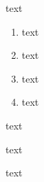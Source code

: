\documentclass[12pt,a4paper]{report}
\begin{document}
\begin{boxx}
text
\begin{enumerate}
\item text
\item text
\item text
\item text
\end{enumerate}
\end{boxx}
\begin{boxx}
text
\end{boxx}
\begin{boxxx}
text
\end{boxxx}
\begin{boxxx}
text
\end{boxxx}
\end{document}
